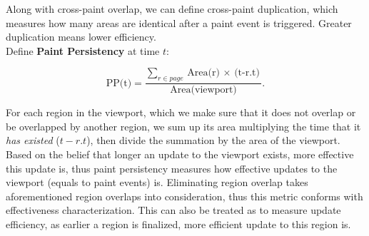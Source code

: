 \documentclass{article}
\begin{document}
Along with cross-paint overlap, we can define cross-paint duplication, which measures how many areas are identical after a paint event is triggered. Greater duplication means lower efficiency. \\

Define \textbf{Paint Persistency} at time $t$: 

$$\textrm{PP(t)} = \frac{\sum _{r \in page} \textrm{Area(r) $\times$ (t-r.t)}}{\textrm{Area(viewport)}}.$$

For each region in the viewport, which we make sure that it does not overlap or be overlapped by another region, we sum up its area multiplying the time that it \emph{has existed} ($t-r.t$), then divide the summation by the area of the viewport. Based on the belief that longer an update to the viewport exists, more effective this update is, thus paint persistency measures how effective updates to the viewport (equals to paint events) is. Eliminating region overlap takes aforementioned region overlaps into consideration, thus this metric conforms with effectiveness characterization. This can also be treated as to measure update efficiency, as earlier a region is finalized, more efficient update to this region is.
\end{document}
